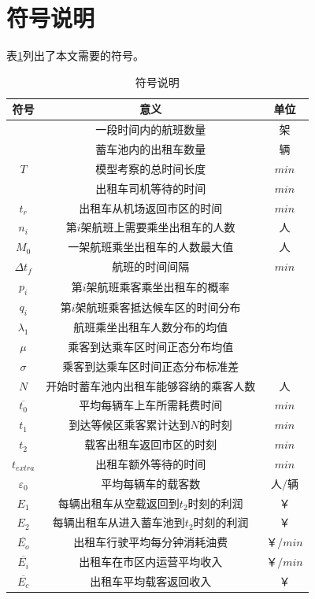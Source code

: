 \documentclass{cumcm}
\begin{document}
\section{符号说明}
表\ref{table-symbol}列出了本文需要的符号。
\begin{table}[H]
	\centering
	\caption{符号说明} 
	\label{table-symbol}
	\begin{tabular*}{0.65\textwidth}{ccc}
		\toprule
		符号 & 意义 & 单位 \\
		\midrule
		\flightnum & 一段时间内的航班数量 & 架 \\
		\taxinum & 蓄车池内的出租车数量 & 辆 \\
		$T$ & 模型考察的总时间长度 & $min$ \\
		\waittime & 出租车司机等待的时间 & $min$ \\
		$t_r$ & 出租车从机场返回市区的时间 & $min$ \\
		$n_i$ & 第$i$架航班上需要乘坐出租车的人数 & 人 \\
		$M_0$ & 一架航班乘坐出租车的人数最大值 & 人 \\
		$\Delta t_f$ & 航班的时间间隔 & $min$ \\
		$p_i$ & 第$i$架航班乘客乘坐出租车的概率 & \\
		$q_i$ & 第$i$架航班乘客抵达候车区的时间分布 & \\
		$\lambda_1$ & 航班乘坐出租车人数分布的均值 & \\
		$\mu$ & 乘客到达乘车区时间正态分布均值 & \\
		$\sigma$ & 乘客到达乘车区时间正态分布标准差 & \\
		$N$ & 开始时蓄车池内出租车能够容纳的乘客人数 & 人 \\
		$\overline{t_0}$ & 平均每辆车上车所需耗费时间 & $min$ \\
		$t_1$ & 到达等候区乘客累计达到$N$的时刻 & $min$ \\
		$t_2$ & 载客出租车返回市区的时刻 & $min$ \\
		$t_{extra}$ & 出租车额外等待的时间 & $min$ \\
		$\varepsilon_0$ & 平均每辆车的载客数 & 人$/$辆 \\
		$E_1$ & 每辆出租车从空载返回到$t_2$时刻的利润 & ￥ \\
		$E_2$ & 每辆出租车从进入蓄车池到$t_2$时刻的利润 & ￥ \\
		$\overline{E_o}$ & 出租车行驶平均每分钟消耗油费 & ￥$/min$ \\
		$\overline{E_i}$ & 出租车在市区内运营平均收入 & ￥$/min$ \\
		$\overline{E_c}$ & 出租车平均载客返回收入 & ￥ \\
		\bottomrule
	\end{tabular*}
\end{table}
\end{document}
